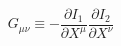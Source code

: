 \begin{equation}
G_{\mu \nu} 
\equiv 
- \frac{\partial I_1}{\partial X^\mu} 
  \frac{\partial I_2}{\partial X^\nu}
\label{G}
\end{equation}

